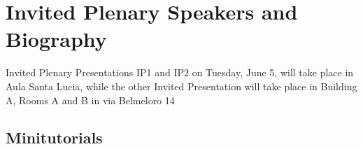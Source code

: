 \documentclass[10pt, a4paper]{book}
\begin{document}
\pagestyle{fancy} %






\chapter*{Invited Plenary Speakers and Biography}
{\small{Invited Plenary Presentations  IP1 and IP2 on Tuesday, June 5, will take place in Aula Santa Lucia, while the other Invited Presentation will take place in Building A, Rooms A and B in via Belmeloro 14}}



\newpage
\section*{Minitutorials}



%
%
%
%
\end{document}
